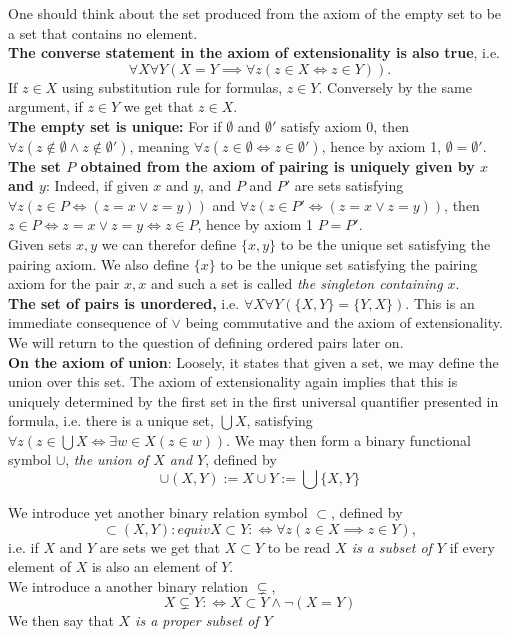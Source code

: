 \begin{remark}
    One should think about the set produced from the axiom of the empty set to be a set that contains no element.\\ \textbf{The converse statement in the axiom of extensionality is also true}, i.e. 
    $$\forall X \forall Y(X=Y\implies \forall z(z\in X\iff z\in Y)).$$ 
    If $z\in X$
    using substitution rule for formulas, $z\in Y$. Conversely by the same argument, if $z\in Y$ we get that $z\in X$.\\
    \textbf{The empty set is unique:} For if $\emptyset$ and $\emptyset'$ satisfy axiom 0, then $\forall z(z\notin \emptyset \wedge z\notin \emptyset')$, meaning $\forall z(z\in \emptyset \iff z\in \emptyset')$, hence by axiom 1, $\emptyset = \emptyset'$.\\
    \textbf{The set $P$ obtained from the axiom of pairing is uniquely given by $x$ and $y$}: Indeed, if given $x$ and $y$, and $P$ and $P'$ are sets satisfying $\forall z(z\in P \iff (z=x\vee z=y))$ and $\forall z(z\in P' \iff (z=x\vee z=y))$, then $z\in P\iff z=x \vee z=y \iff z\in P$, hence by axiom 1 $P=P'$.\\
    Given sets $x,y$ we can therefor define $\{x,y\}$ to be the unique set satisfying the pairing axiom. We also define $\{x\}$ to be the unique set satisfying the pairing axiom for the pair $x,x$ and such a set is called \textit{the singleton containing $x$}.\\
    \textbf{The set of pairs is unordered,} i.e. $\forall X\forall Y(\{X,Y\}=\{Y,X\})$. This is an immediate consequence of $\vee$ being commutative and the axiom of extensionality. We will return to the question of defining ordered pairs later on.\\
    \textbf{On the axiom of union}: Loosely, it states that given a set, we may define the union over this set. The axiom of extensionality again implies that this is uniquely determined by the first set in the first universal quantifier presented in formula, i.e. there is a unique set, $\bigcup X$, satisfying $\forall z(z\in \bigcup X \iff \exists w\in X(z\in w))$. We may then form a binary functional symbol $\cup$, \textit{the union of $X$ and $Y$}, defined by
    $$\cup(X,Y):= X\cup Y := \bigcup \{X,Y\}$$
\end{remark}
\begin{definition}
    We introduce yet another binary relation symbol $\subset$, defined by 
    $$\subset(X,Y):equiv X \subset Y :\iff \forall z(z\in X \implies z\in Y),$$
    i.e. if $X$ and $Y$ are sets we get that $X\subset Y$ to be read \textit{$X$ is a subset of $Y$} if every element of $X$ is also an element of $Y$.\\
    We introduce a another binary relation $\subsetneq$,
    $$ X\subsetneq Y :\iff X\subset Y \wedge \neg(X=Y)$$
    We then say that \textit{$X$ is a proper subset of $Y$}
\end{definition}
